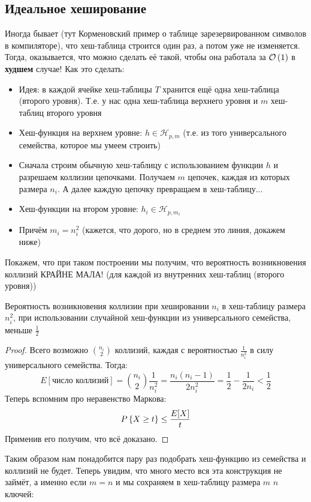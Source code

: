 \subsection{Идеальное хеширование}
Иногда бывает (тут Корменовский пример о таблице зарезервированном символов в компиляторе), что хеш-таблица строится один раз, а потом уже не изменяется. Тогда, оказывается, что можно сделать её такой, чтобы она работала за $\mathcal{O}\left(1\right)$ в \textbf{худшем} случае!
Как это сделать:
\begin{itemize}
    \item Идея: в каждой ячейке хеш-таблицы $T$ хранится ещё одна хеш-таблица (второго уровня). Т.е. у нас одна хеш-таблица верхнего уровня и $m$ хеш-таблиц второго уровня
    \item Хеш-функция на верхнем уровне: $h \in \mathcal{H}_{p, m}$ (т.е. из того универсального семейства, которое мы умеем строить)
    \item Сначала строим обычную хеш-таблицу с использованием функции $h$ и разрешаем коллизии цепочками. Получаем $m$ цепочек, каждая из которых размера $n_i$. А далее каждую цепочку превращаем в хеш-таблицу... 
    \item Хеш-функции на втором уровне: $h_i \in \mathcal{H}_{p, m_i}$
    \item Причём $m_i = n_i^2$ (кажется, что дорого, но в среднем это линия, докажем ниже)
\end{itemize}
Покажем, что при таком построении мы получим, что вероятность возникновения коллизий КРАЙНЕ МАЛА! (для каждой из внутренних хеш-таблиц (второго уровня))
\begin{thm}
Вероятность возникновения коллизии при хешировании $n_i$ в хеш-таблицу размера $n_i^2$, при использовании случайной хеш-функции из универсального семейства, меньше $\frac{1}{2}$
\end{thm}
\begin{proof}
Всего возможно ${n_i \choose 2}$ коллизий, каждая с вероятностью $\frac{1}{n_i^2}$ в силу универсального семейства. Тогда:
\[
    E[\text{число коллизий}] = {n_i \choose 2}\frac{1}{n_i^2} = \frac{n_i(n_i-1)}{2n_i^2} = \frac{1}{2} - \frac{1}{2n_i} < \frac{1}{2}
\]
Теперь вспомним про неравенство Маркова:
\[
    P\left\lbrace X \geq t \right\rbrace \leq \frac{E[X]}{t}
\]
Применив его получим, что всё доказано.
\end{proof}
Таким образом нам понадобится пару раз подобрать хеш-функцию из семейства и коллизий не будет.
Теперь увидим, что много место вся эта конструкция не займёт, а именно если $m = n$ и мы сохраняем в хеш-таблицу размера $m$ $n$ ключей:
